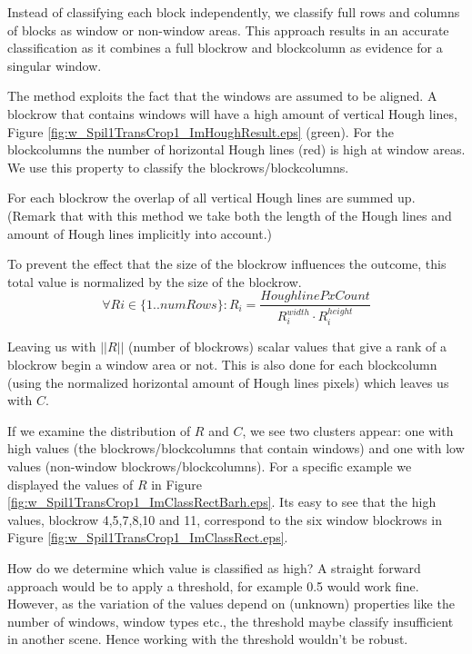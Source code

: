Instead of classifying each block independently, we classify full rows and
columns of blocks as window or non-window areas.  This approach results in an accurate
classification as it combines a full blockrow and blockcolumn as evidence for a singular
window. 

The method exploits the fact that the windows are assumed to be
aligned.
A blockrow that contains windows will have a high amount of vertical
Hough lines, Figure \ref{fig:w_Spil1TransCrop1_ImHoughResult.eps}
(green). For the blockcolumns the number of horizontal Hough lines
 (red) is high at window areas.  We use this property to classify 
 the blockrows/blockcolumns. 

For each blockrow the overlap of all vertical Hough lines are summed up.
(Remark that with this method we take both the length of the Hough lines and
amount of Hough lines implicitly into account.)

To prevent the effect that the size of the blockrow influences the outcome, this total value
is normalized by the size of the blockrow.
\[\forall Ri\in \{1..numRows\} : R_i = \frac{HoughlinePxCount}{R_i^{width} \cdot R_i^{height}}\]

Leaving us with $||R||$ (number of blockrows) scalar values that give a rank of a blockrow begin a window area or not.
This is also done for each blockcolumn (using the normalized horizontal amount of
Hough lines pixels) which leaves us with $C$.

If we examine the distribution of $R$ and $C$, we see two clusters appear: one with
high values (the blockrows/blockcolumns that contain windows) and one with low
values (non-window blockrows/blockcolumns). For a specific example we displayed the values of $R$ in Figure \ref{fig:w_Spil1TransCrop1_ImClassRectBarh.eps}.
Its easy to see that the high values, blockrow 4,5,7,8,10 and 11, correspond to the
six window blockrows in Figure \ref{fig:w_Spil1TransCrop1_ImClassRect.eps}.

How do we determine which value is classified as high?  A straight forward
approach would be to apply a threshold, for example 0.5 would work fine.
However, as the variation of the values depend on (unknown) properties like the
number of windows, window types etc., the threshold maybe classify insufficient
in another scene.  Hence working with the threshold wouldn't be robust. 

